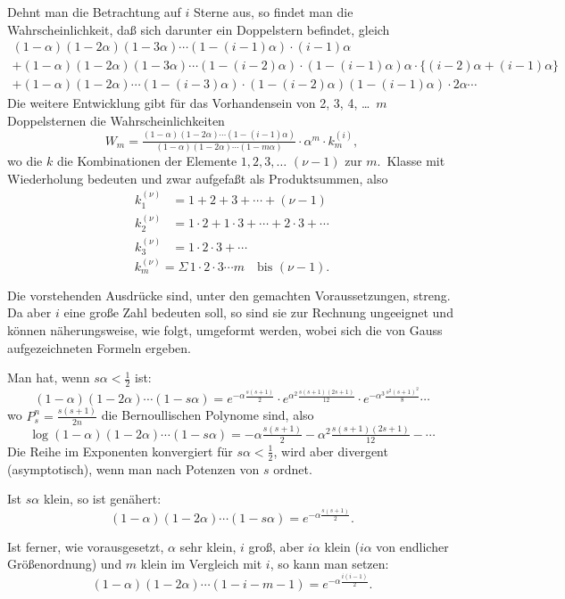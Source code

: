 \documentclass[12pt,a4paper]{article}
\theoremstyle{plain}
\theoremstyle{definition}
\theoremstyle{remark}
\begin{document}
Dehnt man die Betrachtung auf $i$ Sterne aus, so findet man die Wahrscheinlichkeit, da\ss{} sich darunter ein Doppelstern befindet, gleich
\begin{multline*}
(1-\alpha)(1-2\alpha)(1-3\alpha) \cdots (1-(i-1)\alpha) \cdot (i-1)\alpha \\
+ (1-\alpha)(1-2\alpha)(1-3\alpha) \cdots (1-(i-2)\alpha) \cdot (1-(i-1)\alpha)\alpha \cdot \{(i-2)\alpha + (i-1)\alpha\} \\
+ (1-\alpha)(1-2\alpha) \cdots (1-(i-3)\alpha) \cdot (1-(i-2)\alpha)(1-(i-1)\alpha) \cdot 2\alpha \cdots
\end{multline*}
Die weitere Entwicklung gibt f\"ur das Vorhandensein von 2, 3, 4, \ldots\ $m$ Doppelsternen die Wahrscheinlichkeiten
\[
W_m = \tfrac{(1-\alpha)(1-2\alpha) \cdots (1-(i-1)\alpha)}{(1-\alpha)(1-2\alpha) \cdots (1-m\alpha)} \cdot \alpha^m \cdot k_m^{(i)},
\]
wo die $k$ die Kombinationen der Elemente $1, 2, 3, \ldots$ $(\nu-1)$ zur $m$.\ Klasse mit Wiederholung bedeuten und zwar aufgefa\ss t als Produktsummen, also
\begin{align*}
k_1^{(\nu)} &= 1 + 2 + 3 + \cdots + (\nu-1) \\
k_2^{(\nu)} &= 1\cdot2 + 1\cdot3 + \cdots + 2\cdot3 + \cdots \\
k_3^{(\nu)} &= 1\cdot2\cdot3 + \cdots
\end{align*}
\[
k_m^{(\nu)} = \Sigma\, 1 \cdot 2 \cdot 3 \cdots m \quad \text{bis } (\nu-1).
\]

Die vorstehenden Ausdr\"ucke sind, unter den gemachten Voraussetzungen, streng. Da aber $i$ eine gro\ss e Zahl bedeuten soll, so sind sie zur Rechnung ungeeignet und k\"onnen n\"aherungsweise, wie folgt, umgeformt werden, wobei sich die von Gauss aufgezeichneten Formeln ergeben.

Man hat, wenn $s\alpha < \tfrac{1}{2}$ ist:
\[
(1-\alpha)(1-2\alpha) \cdots (1-s\alpha) = e^{-\alpha\frac{s(s+1)}{2}} \cdot e^{\alpha^2\frac{s(s+1)(2s+1)}{12}} \cdot e^{-\alpha^3\frac{s^2(s+1)^2}{8}} \cdots
\]
wo $P_s^n = \tfrac{s(s+1)}{2n}$ die Bernoullischen Polynome sind, also
\[
\log(1-\alpha)(1-2\alpha) \cdots (1-s\alpha) = -\alpha\tfrac{s(s+1)}{2} - \alpha^2\tfrac{s(s+1)(2s+1)}{12} - \cdots
\]
Die Reihe im Exponenten konvergiert f\"ur $s\alpha < \tfrac{1}{2}$, wird aber divergent (asymptotisch), wenn man nach Potenzen von $s$ ordnet.

Ist $s\alpha$ klein, so ist gen\"ahert:
\[
(1-\alpha)(1-2\alpha) \cdots (1-s\alpha) = e^{-\alpha\frac{s(s+1)}{2}}.
\]

Ist ferner, wie vorausgesetzt, $\alpha$ sehr klein, $i$ gro\ss, aber $i\alpha$ klein ($i\alpha$ von endlicher Gr\"o\ss enordnung) und $m$ klein im Vergleich mit $i$, so kann man setzen:
\[
(1-\alpha)(1-2\alpha) \cdots (1-i-m-1) = e^{-\alpha\frac{i(i-1)}{2}}.
\]
\end{document}

